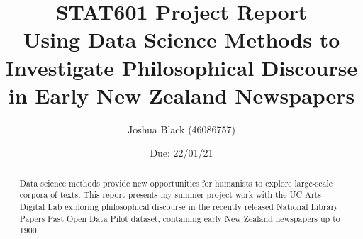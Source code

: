\documentclass{article}
\title{\textbf{STAT601 Project Report} \\ Using Data Science Methods to
Investigate Philosophical Discourse in Early New Zealand Newspapers}
\author{Joshua Black (46086757)}
\date{Due: 22/01/21}
\begin{document}
\maketitle

\begin{abstract}
  Data science methods provide new opportunities for humanists to explore
  large-scale corpora of texts. This report presents my summer project work
  with the UC Arts Digital Lab exploring philosophical discourse in the
  recently released National Library Papers Past Open Data Pilot dataset,
  containing early New Zealand newspapers up to 1900.
\end{abstract}
\end{document}
